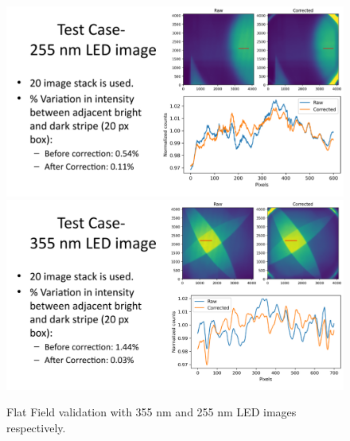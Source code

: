 \documentclass[11pt,a4paper]{article}
\begin{document}
	\begin{figure}
		\centering
		\includegraphics[width=0.9\linewidth]{pics/12.pdf}
		\includegraphics[width=0.9\linewidth]{pics/11.pdf}
		\caption{Flat Field validation with 355 nm and 255 nm LED images respectively.}
		\label{fig:validation}
	\end{figure}
	
\end{document}
